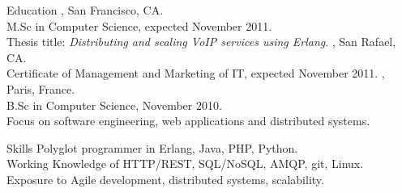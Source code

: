 \documentclass{resume}
\author{~~~~~~Edouard Swiac}
\begin{document}
\maketitle


\begin{category}{Education}
, San Francisco, CA.
\\M.Sc in Computer Science, expected November 2011.
\\Thesis title: \emph{Distributing and scaling VoIP services using Erlang}.
, San Rafael, CA.
\\Certificate of Management and Marketing of IT, expected November 2011.
, Paris, France.
\\B.Sc in Computer Science, November 2010.
\\Focus on software engineering, web applications and distributed systems.
\end{category}


\begin{category}{Skills}
\citemnobullet 
Polyglot programmer in Erlang, Java, PHP, Python.
\\Working Knowledge of HTTP/REST, SQL/NoSQL, AMQP, git, Linux.
\\Exposure to Agile development, distributed systems, scalability.
\end{category}
\end{document}
